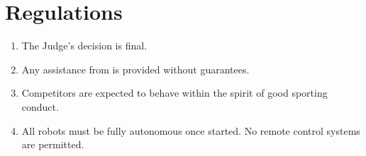 \section{Regulations}
\label{sec:regs}

\begin{enumerate}
\item The Judge's decision is final.
\item Any assistance from \staff is provided without guarantees.
\item Competitors are expected to behave within the spirit of good
      sporting conduct.
\item All robots must be fully autonomous once started. No remote control
      systems are permitted.
\end{enumerate}
